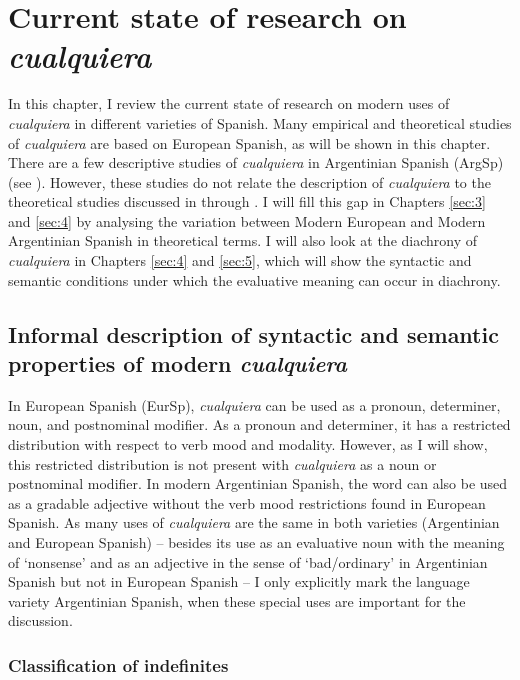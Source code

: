 \chapter{{Current} {state} {of} {research} {on} {\textit{cualquiera}}}\label{sec:2}

In this chapter, I review the current state of research on modern uses of \textit{cualquiera} in different varieties of Spanish. Many empirical and theoretical studies of \textit{cualquiera} are based on European Spanish, as will be shown in this chapter. There are a few descriptive studies of \textit{cualquiera} in Argentinian Spanish (ArgSp) (see ). However, these studies do not relate the description of \textit{cualquiera} to the theoretical studies discussed in  through . I will fill this gap in Chapters \ref{sec:3} and \ref{sec:4} by analysing the variation between Modern European and Modern Argentinian Spanish in theoretical terms. I will also look at the diachrony of \textit{cualquiera} in Chapters \ref{sec:4} and \ref{sec:5}, which will show the syntactic and semantic conditions under which the evaluative meaning can occur in diachrony.


\section[Informal description of the properties of modern \textit{cualquiera}]{{Informal} {description} {of} {syntactic} {and} {semantic} {properties} {of} {modern} {\textit{cualquiera}}}\label{sec:2.1}

In European Spanish (EurSp), \textit{cualquiera} can be used as a pronoun, determiner, noun, and postnominal modifier. As a pronoun and determiner, it has a restricted distribution with respect to verb mood and modality. However, as I will show, this restricted distribution is not present with \textit{cualquiera} as a noun or postnominal modifier. In modern Argentinian Spanish, the word can also be used as a gradable adjective without the verb mood restrictions found in European Spanish. 
As many uses of \textit{cualquiera} are the same in both varieties (Argentinian and European Spanish) -- besides its use as an evaluative noun with the meaning of ‘nonsense’ and as an adjective in the sense of ‘bad/ordinary’ in Argentinian Spanish but not in European Spanish -- I only explicitly mark the language variety Argentinian Spanish, when these special uses are important for the discussion.

\subsection{{Classification} {of} {indefinites}} \label{sec:2.1.1-1} %

